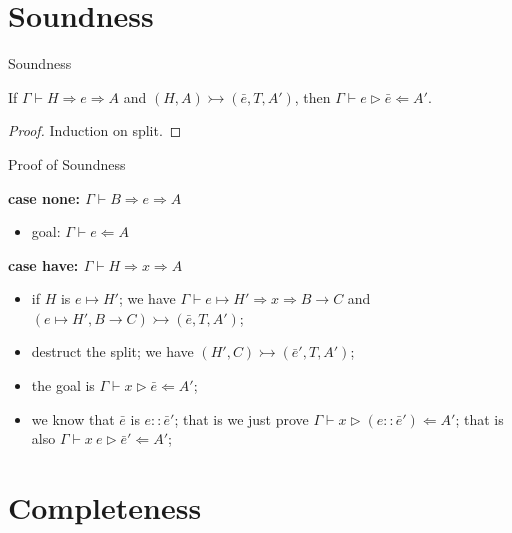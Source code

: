 \section{Soundness}

\begin{frame}{Soundness}

\begin{lemma}[Soundness]
If $\Gamma \vdash H \Rightarrow e \Rightarrow A$ and  $(H, A) \rightarrowtail (\bar{e}, T, A')$, then $\Gamma \vdash e \vartriangleright \bar{e} \Leftarrow A'$.
\end{lemma}

\begin{proof}
Induction on  split.
\end{proof}
\end{frame}

\begin{frame}{Proof of Soundness}

\textbf{case none: $\Gamma \vdash B \Rightarrow e \Rightarrow A$}
\begin{itemize}
	\item goal: $\Gamma \vdash e \Leftarrow A$
\end{itemize}

\noindent\makebox[\linewidth]{\rule{0.9\paperwidth}{0.4pt}}
 
 \textbf{case have: $\Gamma \vdash H \Rightarrow x \Rightarrow A$}
 
\begin{itemize}
	\item if $H$ is $\boxed{e} \mapsto H'$; we have $\Gamma \vdash \boxed{e} \mapsto H' \Rightarrow x \Rightarrow B \rightarrow C$ and $(\boxed{e} \mapsto H', B \rightarrow C)\rightarrowtail (\bar{e}, T, A')$;
	\item destruct the split; we have $(H', C)  \rightarrowtail (\bar{e}', T, A')$;
	\item the goal is $\Gamma \vdash x \triangleright \bar{e} \Leftarrow A'$;
	\item we know that $\bar{e}$ is $e :: \bar{e}'$; that is we just prove $\Gamma \vdash x \triangleright (e :: \bar{e}') \Leftarrow A'$; that is also $\Gamma \vdash x~e \triangleright \bar{e}' \Leftarrow A'$;
\end{itemize}

\end{frame}


\section{Completeness}

